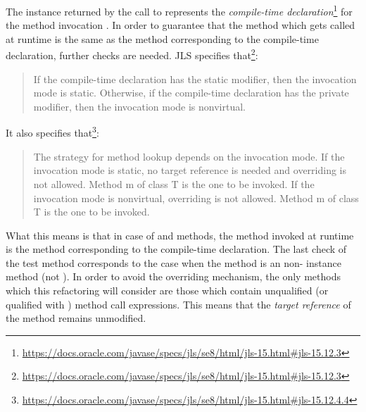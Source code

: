 The  instance returned by the call to  represents the
\textit{compile-time declaration}\footnote{\url{https://docs.oracle.com/javase/specs/jls/se8/html/jls-15.html#jls-15.12.3}}
for the method invocation . In order to guarantee that the method which gets called at runtime is the
same as the method corresponding to the compile-time declaration, further checks are needed.
JLS specifies that\footnote{\url{https://docs.oracle.com/javase/specs/jls/se8/html/jls-15.html#jls-15.12.3}}:
\begin{quote}
    If the compile-time declaration has the static modifier, then the invocation mode is static.
    Otherwise, if the compile-time declaration has the private modifier, then the invocation mode is nonvirtual.
\end{quote}
It also specifies that\footnote{\url{https://docs.oracle.com/javase/specs/jls/se8/html/jls-15.html#jls-15.12.4.4}}:
\begin{quote}
    The strategy for method lookup depends on the invocation mode.
    If the invocation mode is static, no target reference is needed and overriding is not allowed. Method m of class T is the one to be invoked.
    If the invocation mode is nonvirtual, overriding is not allowed. Method m of class T is the one to be invoked.
\end{quote}

What this means is that in case of  and  methods, the method invoked at runtime is the method
corresponding to the compile-time declaration. The last check of the test method corresponds to the case when the method
is an non- instance method (not ). In order to avoid the overriding mechanism, the only
methods which this refactoring will consider are those which contain unqualified (or qualified with ) method
call expressions. This means that the \textit{target reference} of the method remains unmodified.